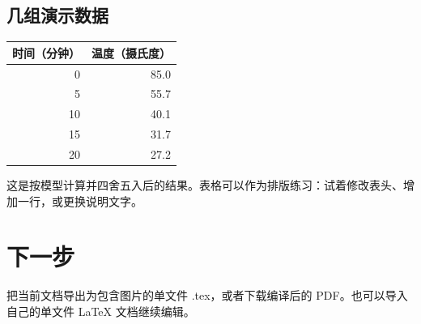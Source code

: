 \documentclass[UTF8,a4paper,11pt,fontset=fandol]{ctexart}
\begin{document}
\subsection{几组演示数据}
\begin{center}
\begin{tabular}{rr}
\toprule
时间（分钟） & 温度（摄氏度）\\
\midrule
0 & 85.0\\
5 & 55.7\\
10 & 40.1\\
15 & 31.7\\
20 & 27.2\\
\bottomrule
\end{tabular}
\end{center}
这是按模型计算并四舍五入后的结果。表格可以作为排版练习：试着修改表头、增加一行，或更换说明文字。

\section*{下一步}
把当前文档导出为包含图片的单文件 .tex，或者下载编译后的 PDF。也可以导入自己的单文件 LaTeX 文档继续编辑。
\end{document}
